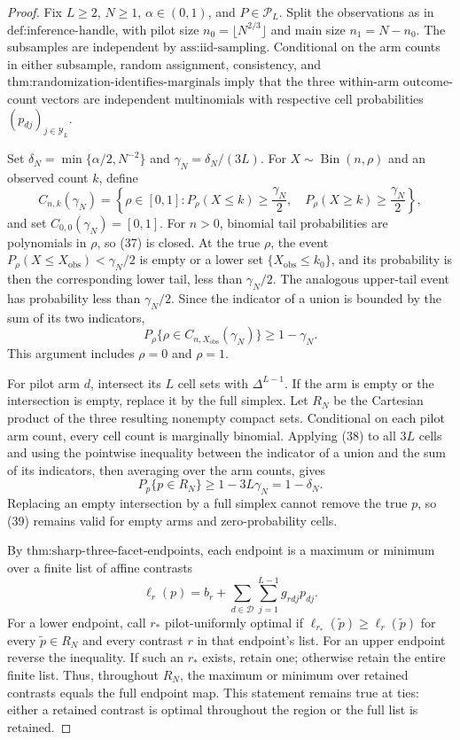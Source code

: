 \documentclass{article}
\begin{document}
\begin{proof}
Fix \(L\geq2\), \(N\geq1\), \(\alpha\in(0,1)\), and \(P\in\mathcal P_L\).  Split the observations as in \(\text{def:inference-handle}\), with pilot size \(n_0=\lfloor N^{2/3}\rfloor\) and main size \(n_1=N-n_0\).  The subsamples are independent by \(\text{ass:iid-sampling}\).  Conditional on the arm counts in either subsample, random assignment, consistency, and \(\text{thm:randomization-identifies-marginals}\) imply that the three within-arm outcome-count vectors are independent multinomials with respective cell probabilities \((p_{dj})_{j\in\mathcal Y_L}\).

Set \(\delta_N=\min\{\alpha/2,N^{-2}\}\) and \(\gamma_N=\delta_N/(3L)\).  For \(X\sim\operatorname{Bin}(n,\rho)\) and an observed count \(k\), define
\[
 C_{n,k}(\gamma_N)=\left\{\rho\in[0,1]:
 P_\rho(X\leq k)\geq\frac{\gamma_N}{2},\quad
 P_\rho(X\geq k)\geq\frac{\gamma_N}{2}\right\},                         \tag{37}
\]
and set \(C_{0,0}(\gamma_N)=[0,1]\).  For \(n>0\), binomial tail probabilities are polynomials in \(\rho\), so (37) is closed.  At the true \(\rho\), the event \(P_\rho(X\leq X_{\mathrm{obs}})<\gamma_N/2\) is empty or a lower set \(\{X_{\mathrm{obs}}\leq k_0\}\), and its probability is then the corresponding lower tail, less than \(\gamma_N/2\).  The analogous upper-tail event has probability less than \(\gamma_N/2\).  Since the indicator of a union is bounded by the sum of its two indicators,
\[
 P_\rho\{\rho\in C_{n,X_{\mathrm{obs}}}(\gamma_N)\}\geq1-\gamma_N.        \tag{38}
\]
This argument includes \(\rho=0\) and \(\rho=1\).

For pilot arm \(d\), intersect its \(L\) cell sets with \(\Delta^{L-1}\).  If the arm is empty or the intersection is empty, replace it by the full simplex.  Let \(R_N\) be the Cartesian product of the three resulting nonempty compact sets.  Conditional on each pilot arm count, every cell count is marginally binomial.  Applying (38) to all \(3L\) cells and using the pointwise inequality between the indicator of a union and the sum of its indicators, then averaging over the arm counts, gives
\[
 P_p\{p\in R_N\}\geq1-3L\gamma_N=1-\delta_N.                              \tag{39}
\]
Replacing an empty intersection by a full simplex cannot remove the true \(p\), so (39) remains valid for empty arms and zero-probability cells.

By \(\text{thm:sharp-three-facet-endpoints}\), each endpoint is a maximum or minimum over a finite list of affine contrasts
\[
 \ell_r(p)=b_r+\sum_{d\in\mathcal D}\sum_{j=1}^{L-1}g_{rdj}p_{dj}.          \tag{40}
\]
For a lower endpoint, call \(r_*\) pilot-uniformly optimal if \(\ell_{r_*}(\widetilde p)\geq\ell_r(\widetilde p)\) for every \(\widetilde p\in R_N\) and every contrast \(r\) in that endpoint's list.  For an upper endpoint reverse the inequality.  If such an \(r_*\) exists, retain one; otherwise retain the entire finite list.  Thus, throughout \(R_N\), the maximum or minimum over retained contrasts equals the full endpoint map.  This statement remains true at ties: either a retained contrast is optimal throughout the region or the full list is retained.


\end{proof}
\end{document}
